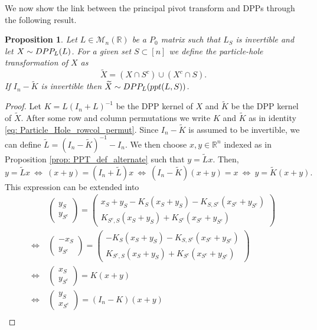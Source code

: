 \documentclass{article}
\numberwithin{equation}{section}
\renewcommand{\tilde}{\widetilde}
\newcommand{\bR}{\mathbb{R}}
\newcommand{\DPP}{\textnormal{DPP}}
\theoremstyle{plain}
\newtheorem{proposition}{Proposition}[section]
\begin{document}
\noindent We now show the link between the principal pivot transform and DPPs through the following result.

\begin{proposition}\label{prop: linear_PPT}
Let $L\in\mathcal{M}_n(\bR)$ be a $P_0$ matrix such that $L_S$ is invertible and let $X\sim \DPP_L(L)$. For a given set $S\subset [n]$ we define the particle-hole transformation of $X$ as
\[\tilde X = (X\cap S^c) \cup (X^c\cap S).\] 
If $I_n-\tilde K$ is invertible then $\tilde X\sim \DPP_L(ppt(L, S))$.
\end{proposition}
\begin{proof}
Let $K=L(I_n+L)^{-1}$ be the DPP kernel of $X$ and $\tilde K$ be the DPP kernel of $\tilde X$. After some row and column permutations we write $K$ and $\tilde K$ as in identity \eqref{eq: Particle_Hole_rowcol_permut}. Since $I_n-\tilde K$ is assumed to be invertible, we can define $\tilde L=(I_n-\tilde K)^{-1}-I_n$. We then choose $x,y\in\bR^n$ indexed as in Proposition \ref{prop: PPT_def_alternate} such that $y=\tilde L x$. Then,
\[y=\tilde L x~\Leftrightarrow~(x+y)=(I_n+\tilde L)x~\Leftrightarrow~(I_n-\tilde K)(x+y)=x~\Leftrightarrow~y=\tilde K(x+y).\]
This expression can be extended into
\begin{align*}
& \begin{pmatrix} y_S \\ y_{S^c} \end{pmatrix}=\begin{pmatrix} x_S + y_S -K_S(x_S+y_S) -K_{S, S^c}(x_{S^c}+y_{S^c}) \\
K_{S^c, S}(x_S+y_S) + K_{S^c}(x_{S^c}+y_{S^c})
\end{pmatrix}\\
\Leftrightarrow~ & \begin{pmatrix} -x_S \\ y_{S^c} \end{pmatrix}=\begin{pmatrix} -K_S(x_S+y_S) -K_{S, S^c}(x_{S^c}+y_{S^c}) \\
K_{S^c, S}(x_S+y_S) + K_{S^c}(x_{S^c}+y_{S^c})
\end{pmatrix}\\
\Leftrightarrow~ & \begin{pmatrix} x_S \\ y_{S^c} \end{pmatrix}=K(x+y)\\
\Leftrightarrow~ & \begin{pmatrix} y_S \\ x_{S^c} \end{pmatrix}=(I_n-K)(x+y)\\

\end{align*}
\end{proof}
\end{document}
